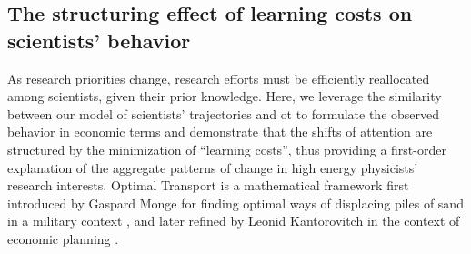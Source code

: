 \documentclass{article}
\begin{document}
\subsection{\label{sec:optimal-transport}The structuring effect of learning costs on scientists' behavior}

As research priorities change, research efforts must be efficiently reallocated among scientists, given their prior knowledge. Here, we leverage the similarity between our model of scientists' trajectories and \gls{ot} \citep{muzellec2017tsallis,li2019learning} to formulate the observed behavior in economic terms and demonstrate that the shifts of attention are structured by the minimization of ``learning costs'', thus providing a first-order explanation of the aggregate patterns of change in high energy physicists' research interests. Optimal Transport is a mathematical framework first introduced by Gaspard Monge for finding optimal ways of displacing piles of sand in a military context \citep{monge1781memoire}, and later refined by Leonid Kantorovitch in the context of economic planning \citep{kantorovich2006translocation}.
\end{document}

